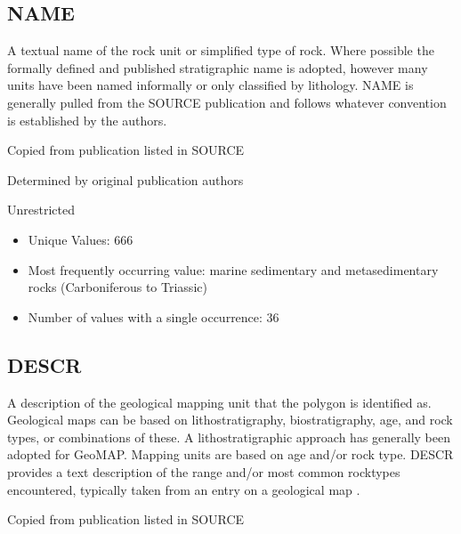 \documentclass[letterpaper,10pt,english]{sphinxmanual}
\begin{document}
\subsection{NAME}
\label{\detokenize{field_glossary:name}}
A textual name of the rock unit or simplified type of rock. Where possible the formally defined and published stratigraphic name is adopted, however many units have been named informally or only classified by lithology.  NAME is generally pulled from the SOURCE publication and follows whatever convention is established by the authors.

Copied from publication listed in SOURCE

Determined by original publication authors


Unrestricted

\begin{itemize}
\item {} 
Unique Values: 666

\item {} 
Most frequently occurring value: marine sedimentary and metasedimentary rocks (Carboniferous to Triassic)

\item {} 
Number of values with a single occurrence: 36

\end{itemize}


\subsection{DESCR}
\label{\detokenize{field_glossary:descr}}
A description of the geological mapping unit that the polygon is identified as. Geological maps can be based on lithostratigraphy, biostratigraphy, age, and rock types, or combinations of these. A lithostratigraphic approach has generally been adopted for GeoMAP. Mapping units are based on age and/or rock type. DESCR provides a text description of the range and/or most common rock\sphinxhyphen{}types encountered, typically taken from an entry on a geological map {\hyperref[\detokenize{legend::doc}]{}}.

Copied from publication listed in SOURCE
\end{document}

